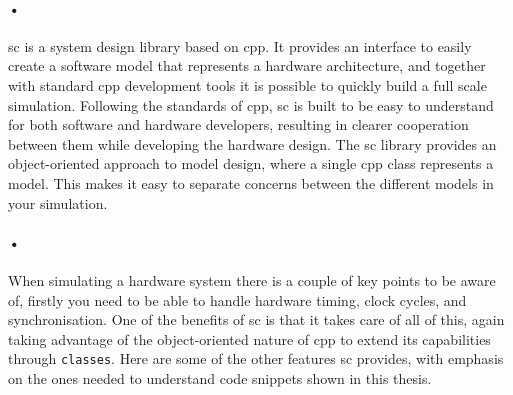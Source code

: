 \documentclass[a4paper, 12pt]{report}
\newcommand{\codeword}[1]{\texttt{#1}}
\begin{document}
\paragraph{•}
\gls{sc} is a system design library based on \gls{cpp}\cite{systemc}.
It provides an interface to easily create a software model that represents a hardware architecture, and together with standard \gls{cpp} development tools it is possible to quickly build a full scale simulation.
Following the standards of \gls{cpp}, \gls{sc} is built to be easy to understand for both software and hardware developers, resulting in clearer cooperation between them while developing the hardware design.
The \gls{sc} library provides an object-oriented approach to model design, where a single \gls{cpp} class represents a model.
This makes it easy to separate concerns between the different models in your simulation.

\paragraph{•}
When simulating a hardware system there is a couple of key points to be aware of, firstly you need to be able to handle hardware timing, clock cycles, and synchronisation.
One of the benefits of \gls{sc} is that it takes care of all of this, again taking advantage of the object-oriented nature of \gls{cpp} to extend its capabilities through \codeword{classes}.
Here are some of the other features \gls{sc} provides, with emphasis on the ones needed to understand code snippets shown in this thesis.
\end{document}
